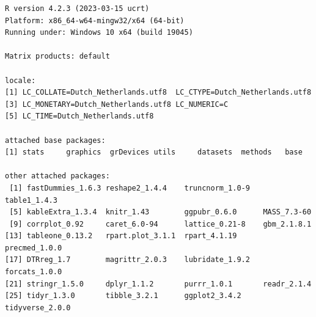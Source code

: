 \documentclass[
  letterpaper,
  DIV=11,
  numbers=noendperiod]{scrreprt}
\begin{document}
\begin{verbatim}
R version 4.2.3 (2023-03-15 ucrt)
Platform: x86_64-w64-mingw32/x64 (64-bit)
Running under: Windows 10 x64 (build 19045)

Matrix products: default

locale:
[1] LC_COLLATE=Dutch_Netherlands.utf8  LC_CTYPE=Dutch_Netherlands.utf8   
[3] LC_MONETARY=Dutch_Netherlands.utf8 LC_NUMERIC=C                      
[5] LC_TIME=Dutch_Netherlands.utf8    

attached base packages:
[1] stats     graphics  grDevices utils     datasets  methods   base     

other attached packages:
 [1] fastDummies_1.6.3 reshape2_1.4.4    truncnorm_1.0-9   table1_1.4.3     
 [5] kableExtra_1.3.4  knitr_1.43        ggpubr_0.6.0      MASS_7.3-60      
 [9] corrplot_0.92     caret_6.0-94      lattice_0.21-8    gbm_2.1.8.1      
[13] tableone_0.13.2   rpart.plot_3.1.1  rpart_4.1.19      precmed_1.0.0    
[17] DTRreg_1.7        magrittr_2.0.3    lubridate_1.9.2   forcats_1.0.0    
[21] stringr_1.5.0     dplyr_1.1.2       purrr_1.0.1       readr_2.1.4      
[25] tidyr_1.3.0       tibble_3.2.1      ggplot2_3.4.2     tidyverse_2.0.0  


\end{verbatim}
\end{document}

